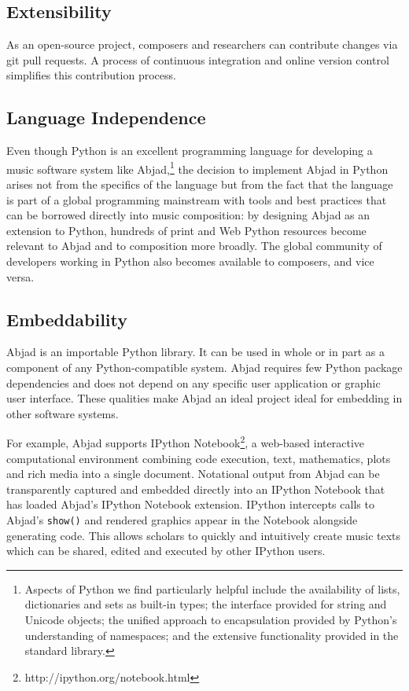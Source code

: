 \documentclass{article}
\begin{document}
\subsection{Extensibility}

As an open-source project, composers and researchers can contribute changes via
git pull requests. A process of continuous integration and online version
control simplifies this contribution process.

\subsection{Language Independence}

Even though Python is an excellent programming language for developing a music
software system like Abjad,\footnote{Aspects of Python we find particularly
helpful include the availability of lists, dictionaries and sets as built-in
types; the interface provided for string and Unicode objects; the unified
approach to encapsulation provided by Python's understanding of namespaces; and
the extensive functionality provided in the standard library.} the decision to
implement Abjad in Python arises not from the specifics of the language but
from the fact that the language is part of a global programming mainstream with
tools and best practices that can be borrowed directly into music composition:
by designing Abjad as an extension to Python, hundreds of print and Web Python
resources become relevant to Abjad and to composition more broadly. The global
community of developers working in Python also becomes available to composers,
and vice versa.

\subsection{Embeddability}

Abjad is an importable Python library. It can be used in whole or in part as a
component of any Python-compatible system. Abjad requires few Python package
dependencies and does not depend on any specific user application or graphic
user interface. These qualities make Abjad an ideal project ideal for embedding
in other software systems.

For example, Abjad supports IPython
Notebook\footnote{http://ipython.org/notebook.html}, a web-based interactive
computational environment combining code execution, text, mathematics, plots
and rich media into a single document. Notational output from Abjad can be
transparently captured and embedded directly into an IPython Notebook that has
loaded Abjad's IPython Notebook extension. IPython intercepts calls to Abjad's
\texttt{show()} and rendered graphics appear in the Notebook alongside
generating code. This allows scholars to quickly and intuitively create music
texts which can be shared, edited and executed by other IPython users.
\end{document}
